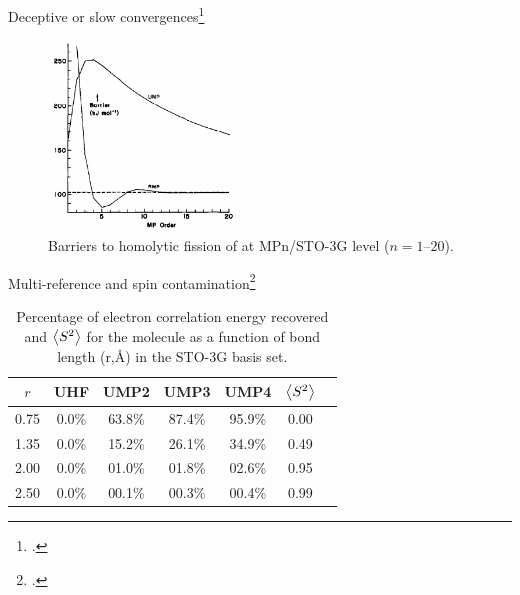 \documentclass[xcolor=x11names,compress]{beamer}
\renewcommand{\(}{\begin{columns}}
\renewcommand{\)}{\end{columns}}
\newcommand{\<}[1]{\begin{column}{#1}}
\renewcommand{\>}{\end{column}}
\begin{document}
\begin{frame}{Deceptive or slow convergences\footcite{gill_deceptive_1986}}

\begin{figure}
    \centering

    \includegraphics[width=0.45\textwidth]{gill1986.png}

    \caption{\centering Barriers to homolytic fission of  at MPn/STO-3G level ($n = 1$--$20$).}
    \label{fig:my_label}
\end{figure}

    
\end{frame}

\begin{frame}{Multi-reference and spin contamination\footcite{gill_why_1988}}
\begin{table}
    \centering
    \begin{tabular}{c c c c c c c}
\hline
 $r$ & UHF & UMP2 & UMP3 & UMP4 & $\expval{S^2}$ \\
\hline
0.75 & 0.0\% & 63.8\% & 87.4\% & 95.9\% & 0.00\\
1.35 & 0.0\% & 15.2\% & 26.1\% & 34.9\% & 0.49\\
2.00 & 0.0\% & 01.0\% & 01.8\% & 02.6\% & 0.95\\
2.50 & 0.0\% & 00.1\% & 00.3\% & 00.4\% & 0.99\\
\hline
\end{tabular}
    \caption{\centering Percentage of electron correlation energy recovered and $\expval{S^2}$ for the  molecule as a function of bond length (r,\si{\angstrom}) in the STO-3G basis set.}
    \label{tab:my_label}
\end{table}

    
\end{frame}
\end{document}
